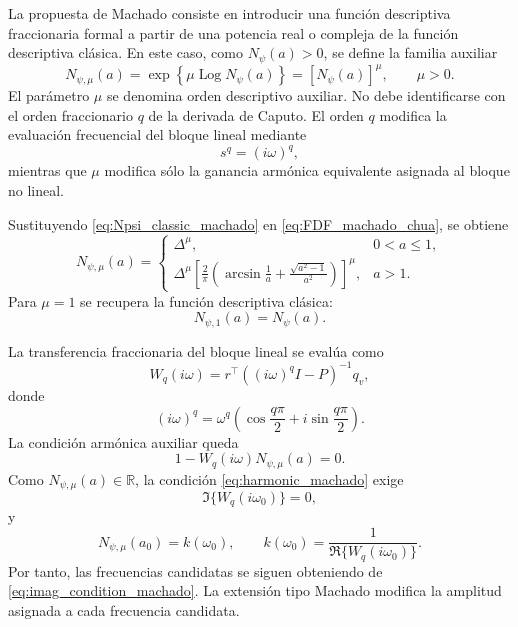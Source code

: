 La propuesta de Machado consiste en introducir una función descriptiva
fraccionaria formal a partir de una potencia real o compleja de la función
descriptiva clásica. En este caso, como \(N_\psi(a)>0\), se define la familia
auxiliar
\begin{equation}
\label{eq:FDF_machado_chua}
N_{\psi,\mu}(a)
=
\exp\left\{
\mu\operatorname{Log}N_\psi(a)
\right\}
=
\left[N_\psi(a)\right]^\mu,
\qquad
\mu>0.
\end{equation}
El parámetro \(\mu\) se denomina orden descriptivo auxiliar. No debe
identificarse con el orden fraccionario \(q\) de la derivada de Caputo. El
orden \(q\) modifica la evaluación frecuencial del bloque lineal mediante
\[
s^q=(i\omega)^q,
\]
mientras que \(\mu\) modifica sólo la ganancia armónica equivalente asignada
al bloque no lineal.

Sustituyendo \eqref{eq:Npsi_classic_machado} en
\eqref{eq:FDF_machado_chua}, se obtiene
\begin{equation}
\label{eq:Npsi_mu_piecewise_machado}
N_{\psi,\mu}(a)
=
\begin{cases}
\Delta^\mu,
& 0<a\leq 1,\\[2mm]
\displaystyle
\Delta^\mu
\left[
\frac{2}{\pi}
\left(
\arcsin\frac1a+
\frac{\sqrt{a^2-1}}{a^2}
\right)
\right]^\mu,
& a>1.
\end{cases}
\end{equation}
Para \(\mu=1\) se recupera la función descriptiva clásica:
\begin{equation}
N_{\psi,1}(a)=N_\psi(a).
\end{equation}

La transferencia fraccionaria del bloque lineal se evalúa como
\begin{equation}
\label{eq:Wq_machado_seed}
W_q(i\omega)
=
r^\top\left((i\omega)^qI-P\right)^{-1}q_v,
\end{equation}
donde
\begin{equation}
\label{eq:lambda_machado}
(i\omega)^q
=
\omega^q
\left(
\cos\frac{q\pi}{2}
+
i\sin\frac{q\pi}{2}
\right).
\end{equation}
La condición armónica auxiliar queda
\begin{equation}
\label{eq:harmonic_machado}
1-W_q(i\omega)N_{\psi,\mu}(a)=0.
\end{equation}
Como \(N_{\psi,\mu}(a)\in\mathbb R\), la condición
\eqref{eq:harmonic_machado} exige
\begin{equation}
\label{eq:imag_condition_machado}
\Im\{W_q(i\omega_0)\}=0,
\end{equation}
y
\begin{equation}
\label{eq:kmu_condition_machado}
N_{\psi,\mu}(a_0)
=
k(\omega_0),
\qquad
k(\omega_0)
=
\frac{1}{\Re\{W_q(i\omega_0)\}}.
\end{equation}
Por tanto, las frecuencias candidatas se siguen obteniendo de
\eqref{eq:imag_condition_machado}. La extensión tipo Machado modifica la
amplitud asignada a cada frecuencia candidata.

